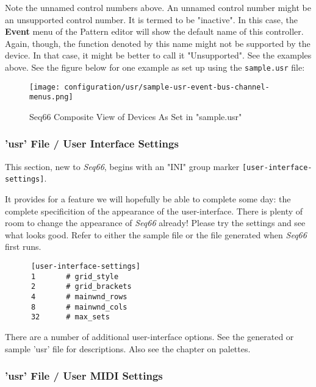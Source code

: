    Note the unnamed control numbers above.
   An unnamed control number might be an unsupported control number.
   It is termed to be "inactive".  In this case, the \textbf{Event} menu of
   the Pattern editor will show the default name of this controller.
   Again, though, the function denoted by this name might not be supported by
   the device.  In that case, it might be better to call it "Unsupported".
   See the examples above.  See the figure below for one example as set up using
   the \texttt{sample.usr} file:


\begin{figure}[H]
   \centering 
   \texttt{[image: configuration/usr/sample-usr-event-bus-channel-menus.png]}
   \caption{Seq66 Composite View of Devices As Set in "sample.usr"}
   \label{fig:sample_usr_event_bus_channel_menus}
\end{figure}

\subsubsection{'usr' File / User Interface Settings}
\label{subsubsec:usr_file_user_interface_settings}

   This section, new to \textsl{Seq66}, begins with an
   "INI" group marker \texttt{[user-interface-settings]}.

   It provides for a feature we will hopefully be able to complete some day:
   the complete specificition of the appearance of the user-interface.
   There is plenty of room to change the appearance of
   \textsl{Seq66} already!  Please try the settings and see what looks good.
   Refer to either the sample file or the file generated when \textsl{Seq66}
   first runs.

   \begin{verbatim}
      [user-interface-settings]
      1       # grid_style
      2       # grid_brackets
      4       # mainwnd_rows
      8       # mainwnd_cols
      32      # max_sets
   \end{verbatim}

   There are a number of additional user-interface options.  See the generated
   or sample 'usr' file for descriptions.  Also see the chapter on palettes.

\subsubsection{'usr' File / User MIDI Settings}
\label{subsubsec:usr_file_user_midi_settings}

